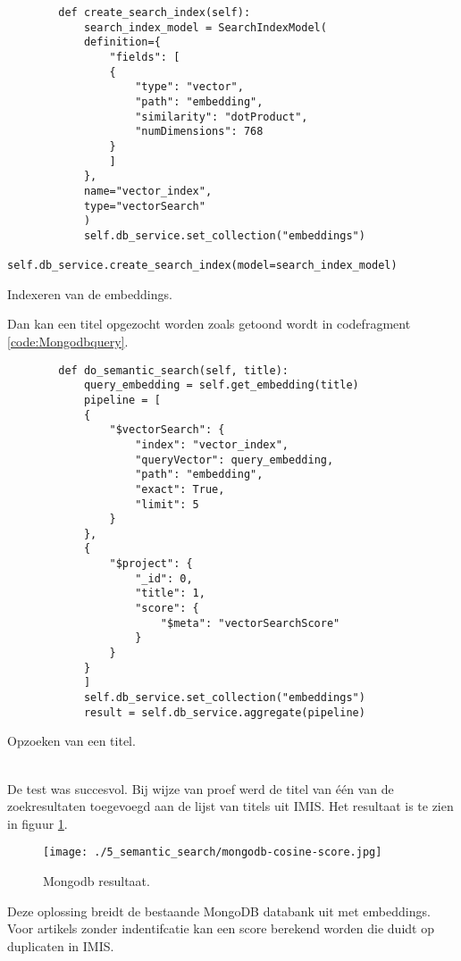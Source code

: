 \begin{listing}
    \begin{verbatim}
        def create_search_index(self):
            search_index_model = SearchIndexModel(
            definition={
                "fields": [
                {
                    "type": "vector",
                    "path": "embedding",
                    "similarity": "dotProduct",
                    "numDimensions": 768
                }
                ]
            },
            name="vector_index",
            type="vectorSearch"
            )
            self.db_service.set_collection("embeddings")
            self.db_service.create_search_index(model=search_index_model)
    \end{verbatim}
    \caption[MongoDB calculate index]{Indexeren van de embeddings.}
    \label{code:Mongodbindex}
\end{listing}
Dan kan een titel opgezocht worden zoals getoond wordt in codefragment \ref{code:Mongodbquery}.
\begin{listing}
    \begin{verbatim}
        def do_semantic_search(self, title):
            query_embedding = self.get_embedding(title)
            pipeline = [
            {
                "$vectorSearch": {
                    "index": "vector_index",
                    "queryVector": query_embedding,
                    "path": "embedding",
                    "exact": True,
                    "limit": 5
                }
            },
            {
                "$project": {
                    "_id": 0,
                    "title": 1,
                    "score": {
                        "$meta": "vectorSearchScore"
                    }
                }
            }
            ]
            self.db_service.set_collection("embeddings")
            result = self.db_service.aggregate(pipeline)
    \end{verbatim}
    \caption[MongoDB query]{Opzoeken van een titel.}
    \label{code:Mongodbquery}
\end{listing}
\\
De test was succesvol. Bij wijze van proef werd de titel van één van de zoekresultaten toegevoegd aan de lijst van titels uit IMIS. Het resultaat is te zien in figuur \ref{fig:Mongodb}.
\begin{figure}
    \centering
    \texttt{[image: ./5\_semantic\_search/mongodb-cosine-score.jpg]}
    \caption[Mongodb resultaat.]{\label{fig:Mongodb}Mongodb resultaat.}
\end{figure}
Deze oplossing breidt de bestaande MongoDB databank uit met embeddings. Voor artikels zonder indentifcatie kan een score berekend worden die duidt op duplicaten in IMIS. 
